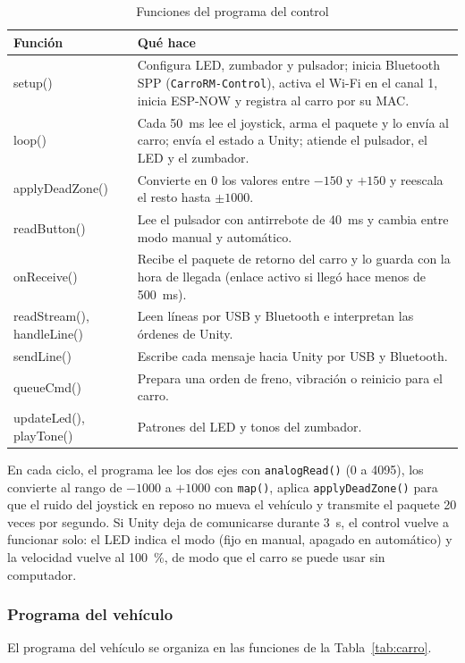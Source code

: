 \documentclass[journal]{IEEEtran}
\begin{document}
\begin{table}[t]
\centering
\caption{Funciones del programa del control}
\label{tab:control}
\begin{tabular}{@{}>{\ttfamily\raggedright}p{2.6cm}p{5.0cm}@{}}
\toprule
\textrm{Función} & Qué hace \\
\midrule
setup() & Configura LED, zumbador y pulsador; inicia Bluetooth SPP (\texttt{CarroRM-Control}), activa el Wi-Fi en el canal 1, inicia ESP-NOW y registra al carro por su MAC. \\
loop() & Cada 50~ms lee el joystick, arma el paquete y lo envía al carro; envía el estado a Unity; atiende el pulsador, el LED y el zumbador. \\
applyDeadZone() & Convierte en 0 los valores entre $-150$ y $+150$ y reescala el resto hasta $\pm1000$. \\
readButton() & Lee el pulsador con antirrebote de 40~ms y cambia entre modo manual y automático. \\
onReceive() & Recibe el paquete de retorno del carro y lo guarda con la hora de llegada (enlace activo si llegó hace menos de 500~ms). \\
readStream(), handleLine() & Leen líneas por USB y Bluetooth e interpretan las órdenes de Unity. \\
sendLine() & Escribe cada mensaje hacia Unity por USB y Bluetooth. \\
queueCmd() & Prepara una orden de freno, vibración o reinicio para el carro. \\
updateLed(), playTone() & Patrones del LED y tonos del zumbador. \\
\bottomrule
\end{tabular}
\end{table}

En cada ciclo, el programa lee los dos ejes con \texttt{analogRead()} (0 a 4095), los convierte al rango de $-1000$ a $+1000$ con \texttt{map()}, aplica \texttt{applyDeadZone()} para que el ruido del joystick en reposo no mueva el vehículo y transmite el paquete 20 veces por segundo. Si Unity deja de comunicarse durante 3~s, el control vuelve a funcionar solo: el LED indica el modo (fijo en manual, apagado en automático) y la velocidad vuelve al 100~\%, de modo que el carro se puede usar sin computador.

\subsubsection{Programa del vehículo}
El programa del vehículo se organiza en las funciones de la Tabla~\ref{tab:carro}.
\end{document}
